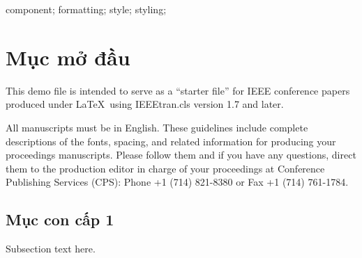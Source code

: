 \documentclass[10pt, conference, a4paper, compsocconf]{IEEEtran}
\begin{document}




\maketitle


\begin{abstract}
The abstract goes here. DO NOT USE SPECIAL CHARACTERS, SYMBOLS, OR MATH IN YOUR TITLE OR ABSTRACT.

\end{abstract}

\begin{IEEEkeywords}
component; formatting; style; styling;

\end{IEEEkeywords}


%
\IEEEpeerreviewmaketitle



\section{Mục mở đầu}
This demo file is intended to serve as a ``starter file''
for IEEE conference papers produced under \LaTeX\ using
IEEEtran.cls version 1.7 and later.

All manuscripts must be in English. These guidelines include complete descriptions of the fonts, spacing, and related information for producing your proceedings manuscripts. Please follow them and if you have any questions, direct them to the production editor in charge of your proceedings at Conference Publishing Services (CPS): Phone +1 (714) 821-8380 or Fax +1 (714) 761-1784.

\subsection{Mục con cấp 1}
Subsection text here.
\end{document}

